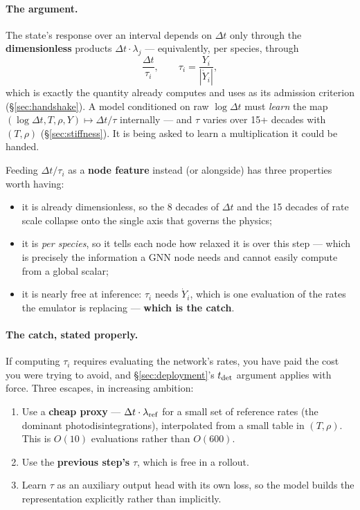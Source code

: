 \paragraph{The argument.} The state's response over an interval depends on
$\Delta t$ only through the \textbf{dimensionless} products $\Delta t\cdot
\lambda_j$ --- equivalently, per species, through
%
\begin{equation}
\frac{\Delta t}{\tau_i}, \qquad \tau_i = \frac{Y_i}{|\dot Y_i|},
\label{eq:dttau}
\end{equation}
%
which is exactly the quantity  already computes and uses as
its admission criterion (\S\ref{sec:handshake}). A model conditioned on raw
$\log\Delta t$ must \emph{learn} the map
$(\log\Delta t, T, \rho, Y) \mapsto \Delta t/\tau$ internally --- and $\tau$
varies over 15+ decades with $(T, \rho)$ (\S\ref{sec:stiffness}). It is being
asked to learn a multiplication it could be handed.

Feeding $\Delta t/\tau_i$ as a \textbf{node feature} instead (or alongside) has
three properties worth having:

\begin{itemize}
\item it is already dimensionless, so the 8 decades of $\Delta t$ and the 15
  decades of rate scale collapse onto the single axis that governs the physics;
\item it is \emph{per species}, so it tells each node how relaxed it is over
  this step --- which is precisely the information a GNN node needs and cannot
  easily compute from a global scalar;
\item it is nearly free at inference: $\tau_i$ needs $\dot Y_i$, which is one
  evaluation of the rates the emulator is replacing --- \textbf{which is the
  catch}.
\end{itemize}

\paragraph{The catch, stated properly.} If computing $\tau_i$ requires
evaluating the network's rates, you have paid the cost you were trying to avoid,
and \S\ref{sec:deployment}'s $t_{\rm det}$ argument applies with force. Three
escapes, in increasing ambition:

\begin{enumerate}
\item Use a \textbf{cheap proxy} --- $\Delta t\cdot\lambda_{\rm ref}$ for a
  small set of reference rates (the dominant photodisintegrations),
  interpolated from a small table in $(T, \rho)$. This is $O(10)$ evaluations
  rather than $O(600)$.
\item Use the \textbf{previous step's} $\tau$, which is free in a rollout.
\item Learn $\tau$ as an auxiliary output head with its own loss, so the model
  builds the representation explicitly rather than implicitly.
\end{enumerate}

